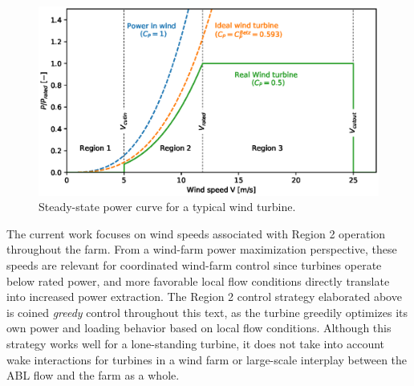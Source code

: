 \begin{figure}[t]
	\centering
	\includegraphics[width=\textwidth]{chapters/introduction/regions.eps}
	\caption{Steady-state power curve for a typical wind turbine. \label{fig:regions}}
\end{figure}

The current work focuses on wind speeds associated with Region 2 operation throughout the farm. From a wind-farm power maximization perspective, these speeds are relevant for coordinated wind-farm control since turbines operate below rated power, and more favorable local flow conditions directly translate into increased power extraction.
The Region 2 control strategy elaborated above is coined \emph{greedy} control throughout this text, as the turbine greedily optimizes its own power and loading behavior based on local flow conditions. Although this strategy works well for a lone-standing turbine, it does not take into account wake interactions for turbines in a wind farm or large-scale interplay between the ABL flow and the farm as a whole.  




